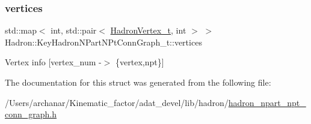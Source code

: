 \subsubsection{\texorpdfstring{vertices}{vertices}}
{\footnotesize\ttfamily std\+::map$<$ int, std\+::pair$<$ \mbox{\hyperlink{structHadron_1_1HadronVertex__t}{Hadron\+Vertex\+\_\+t}}, int $>$ $>$ Hadron\+::\+Key\+Hadron\+N\+Part\+N\+Pt\+Conn\+Graph\+\_\+t\+::vertices}

Vertex info \mbox{[}vertex\+\_\+num -\/$>$ \{vertex,npt\}\mbox{]} 

The documentation for this struct was generated from the following file\+:\begin{DoxyCompactItemize}
\item 
/\+Users/archanar/\+Kinematic\+\_\+factor/adat\+\_\+devel/lib/hadron/\mbox{\hyperlink{lib_2hadron_2hadron__npart__npt__conn__graph_8h}{hadron\+\_\+npart\+\_\+npt\+\_\+conn\+\_\+graph.\+h}}\end{DoxyCompactItemize}

